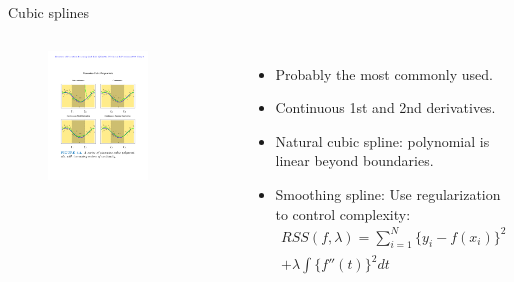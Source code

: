 \documentclass[aspectratio=169]{beamer}
\begin{document}
\begin{frame}{Cubic splines}
    \begin{columns}
    \begin{figure}
        \centering
        \includegraphics[width=0.7\textwidth]{figures/piecewisecubic.pdf}
    \end{figure}
    \begin{itemize}
        \item Probably the most commonly used.
        \item Continuous 1st and 2nd derivatives.
        \item Natural cubic spline: polynomial is linear beyond boundaries.
        \item Smoothing spline: Use  regularization to control complexity:
        \begin{eqnarray*}
            RSS(f, \lambda) = \sum_{i=1}^N \{y_i - f(x_i)\} ^ 2 \\
            + \lambda \int \{f''(t)\}^2 dt
        \end{eqnarray*}
    \end{itemize}
    \end{columns}
\end{frame}
\end{document}
